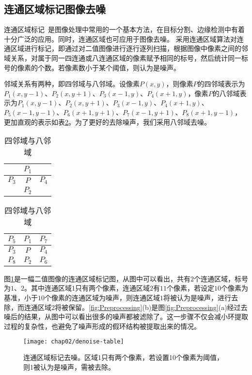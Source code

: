 \subsection{连通区域标记图像去噪}

连通区域标记~\cite{xuzhengguang}是图像处理中常用的一个基本方法，在目标分割、边缘检测中有着十分广泛的应用。同时，连通区域也可应用于图像去噪。
采用连通区域算法对连通区域进行标记，即通过对二值图像进行逐行逐列扫描，根据图像中像素之间的邻域关系，对属于同一四连通或八连通区域的像素赋予相同的标号，然后统计同一标号的像素的个数。若像素数小于某个阈值，则认为是噪声。

邻域关系有两种，即四邻域与八邻域。设像素$P(x, y)$，则像素$P$的四邻域表示为$P_1(x,y-1)$、$P_2(x, y+1)$、$P_3(x-1,y)$、$P_4(x+1,y)$，像素$P$的八邻域表示为$P_1(x,y-1)$、$P_2(x, y+1)$、$P_3(x-1,y)$、$P_4(x+1,y)$、$P_5(x-1,y-1)$、$P_6(x+1, y+1)$、$P_7(x-1,y+1)$、$P_8(x+1, y-1)$，更加直观的表示如表\ref{tab:adjacent}。为了更好的去除噪声，我们采用八邻域去噪。
\begin{table}[H]
\centering
\caption{四邻域与八邻域}
\begin{tabular}{|c|c|c|}
\hline
 & $P_1$ & \\
\hline            
$P_3$ & $P$ & $P_4$\\
\hline           
& $P_2$ & \\
\hline
\end{tabular}
\begin{tabular}{|c|c|c|}
\hline
$P_5$ & $P_1$ & $P_7$\\
\hline            
$P_3$ & $P$ & $P_4$\\
\hline            
$P_8$& $P_2$ & $P_6$ \\
\hline
\end{tabular}

\label{tab:adjacent}
\end{table}


图\ref{fig:denoise-table}是一幅二值图像的连通区域标记图，从图中可以看出，共有$2$个连通区域，标号为$1$、$2$。其中连通区域1只有两个像素，连通区域$2$有$11$个像素，若设定$10$个像素为基准，小于$10$个像素的连通区域为噪声，则连通区域$1$将被认为是噪声，进行去除，而连通区域$2$将被保留。\ref{fig:Preprocessing}(b)是图\ref{fig:Preprocessing}(a)经过去噪后的结果，从图中可以看出很多的噪声都被滤除了。这一步骤不仅会减小环提取过程的复杂性，也避免了噪声形成的假环结构被提取出来的情况。


\begin{figure}[H] %
  \centering
  \texttt{[image: chap02/denoise-table]}
  \caption{连通区域标记去噪。区域1只有两个像素，若设置10个像素为阈值，则1被认为是噪声，需被去除。}
  \label{fig:denoise-table}
\end{figure}



